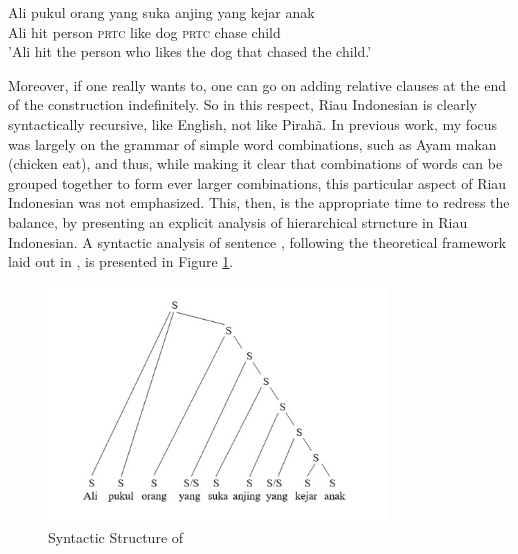 \documentclass[output=paper,colorlinks,citecolor=brown
]{langscibook}
\begin{document}
\ea\label{ex:gil:1}
\gll Ali	pukul	orang	yang	suka	anjing	yang	kejar	anak\\
 Ali	hit	person	\textsc{prtc}	like	dog	\textsc{prtc}	chase	child\\
\glt 'Ali hit the person who likes the dog that chased the child.'
\z

Moreover, if one really wants to, one can go on adding relative clauses at the end of the construction indefinitely. So in this respect, Riau Indonesian is clearly syntactically recursive, like English, not like Pirahã.
In previous work, my focus was largely on the grammar of simple word combinations, such as Ayam makan (chicken eat), and thus, while making it clear that combinations of words can be grouped together to form ever larger combinations, this particular aspect of Riau Indonesian was not emphasized. This, then, is the appropriate time to redress the balance, by presenting an explicit analysis of hierarchical structure in Riau Indonesian. A syntactic analysis of sentence , following the theoretical framework laid out in \citet{gil2000syntactic}, is presented in Figure \ref{fig:gil:fig1}.

\begin{figure}
\centering
\includegraphics[width=0.8\textwidth]{gil_figure1.png}
\caption{\label{fig:gil:fig1}Syntactic Structure of }
\end{figure}
\end{document}
